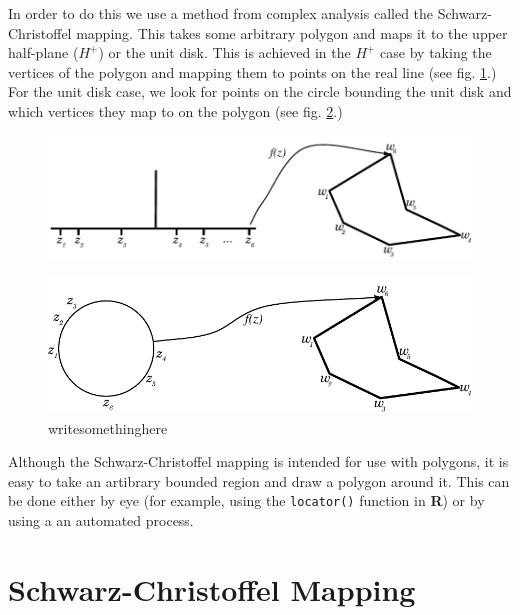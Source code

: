 \documentclass[a4paper,10pt]{amsart}
\newcommand{\sch}{Schwarz-Christoffel }
\begin{document}
In order to do this we use a method from complex analysis called the \sch mapping. This takes some arbitrary polygon and maps it to the upper half-plane ($H^+$) or the unit disk. This is achieved in the $H^+$ case by taking the vertices of the polygon and mapping them to points on the real line (see fig. \ref{reallinedia}.) For the unit disk case, we look for points on the circle bounding the unit disk and which vertices they map to on the polygon (see fig. \ref{unitdiskdia}.)

\begin{figure} [tbp]
\centering
\includegraphics[scale=0.5]{figs/reallinedia.pdf}
\caption{}
\label{reallinedia}
\end{figure}

\begin{figure} [tbp]
\centering
\includegraphics[scale=0.5]{figs/unitdiskdia.pdf}
\caption{writesomethinghere}
\label{unitdiskdia}
\end{figure}




Although the \sch mapping is intended for use with polygons, it is easy to take an artibrary bounded region and draw a polygon around it. This can be done either by eye (for example, using the \texttt{locator()} function in \textbf{R}) or by using a an automated process.



 
\section{\sch Mapping}
\end{document}
